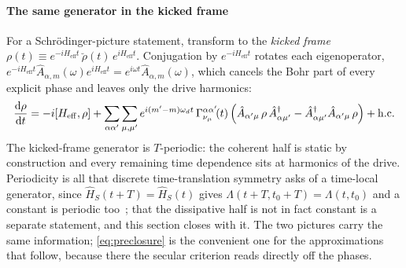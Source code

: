 \documentclass[a4paper,11pt]{article}
\newcommand{\eff}{\mathrm{eff}}
\begin{document}
\paragraph{The same generator in the kicked frame}
For a Schr\"odinger-picture statement, transform to the \emph{kicked frame} $\rho(t) \equiv e^{-iH_\eff t}\,\breve\rho(t)\,e^{iH_\eff t}$. Conjugation by $e^{-iH_\eff t}$ rotates each eigenoperator, $e^{-iH_\eff t}\hat A_{\alpha,m}(\omega)e^{iH_\eff t} = e^{i\omega t}\hat A_{\alpha,m}(\omega)$, which cancels the Bohr part of every explicit phase and leaves only the drive harmonics:
\begin{equation}\label{eq:preclosure-kicked}
  \dv{\rho}{t}
  = -i\comm{H_\eff}{\rho}
  + \sum_{\alpha\alpha'}\sum_{\mu,\mu'} e^{i(m'-m)\omega_d t}\,\Gamma^{\alpha\alpha'}_{\nu_\mu}\!(t)\,
  \Big( \hat A_{\alpha'\mu}\,\rho\,\hat A_{\alpha\mu'}^\dagger
  - \hat A_{\alpha\mu'}^\dagger \hat A_{\alpha'\mu}\,\rho \Big) + \mathrm{h.c.}
\end{equation}
The kicked-frame generator is $T$-periodic: the coherent half is static by construction and every remaining time dependence sits at harmonics of the drive. Periodicity is all that discrete time-translation symmetry asks of a time-local generator, since $\hat H_S(t+T) = \hat H_S(t)$ gives $\Lambda(t+T,t_0+T) = \Lambda(t,t_0)$ and a constant is periodic too~\cite{Nathan2020Universal}; that the dissipative half is not in fact constant is a separate statement, and this section closes with it. The two pictures carry the same information; \cref{eq:preclosure} is the convenient one for the approximations that follow, because there the secular criterion reads directly off the phases.
\end{document}
